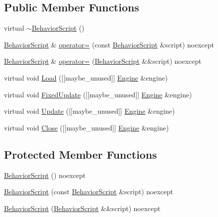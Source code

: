 \subsection*{Public Member Functions}
\begin{DoxyCompactItemize}
\item 
virtual \hyperlink{classmage_1_1_behavior_script_a61e4825ba0fc7746d49faa44ed7bc481}{$\sim$\+Behavior\+Script} ()
\item 
\hyperlink{classmage_1_1_behavior_script}{Behavior\+Script} \& \hyperlink{classmage_1_1_behavior_script_adb153676123adadacf023e4f3804abf5}{operator=} (const \hyperlink{classmage_1_1_behavior_script}{Behavior\+Script} \&script) noexcept
\item 
\hyperlink{classmage_1_1_behavior_script}{Behavior\+Script} \& \hyperlink{classmage_1_1_behavior_script_aefeae227ee8d2452bf05782604f5011e}{operator=} (\hyperlink{classmage_1_1_behavior_script}{Behavior\+Script} \&\&script) noexcept
\item 
virtual void \hyperlink{classmage_1_1_behavior_script_ae7864876b2ffb1d1d8d8a56e3099f1f2}{Load} (\mbox{[}\mbox{[}maybe\+\_\+unused\mbox{]}\mbox{]} \hyperlink{classmage_1_1_engine}{Engine} \&engine)
\item 
virtual void \hyperlink{classmage_1_1_behavior_script_ae4b9cb7f3ee9f96d69682aef42f8bb12}{Fixed\+Update} (\mbox{[}\mbox{[}maybe\+\_\+unused\mbox{]}\mbox{]} \hyperlink{classmage_1_1_engine}{Engine} \&engine)
\item 
virtual void \hyperlink{classmage_1_1_behavior_script_a085634661326b59850c1111e537baa4e}{Update} (\mbox{[}\mbox{[}maybe\+\_\+unused\mbox{]}\mbox{]} \hyperlink{classmage_1_1_engine}{Engine} \&engine)
\item 
virtual void \hyperlink{classmage_1_1_behavior_script_a5a8d2d38b369e193bf8cc20a74708397}{Close} (\mbox{[}\mbox{[}maybe\+\_\+unused\mbox{]}\mbox{]} \hyperlink{classmage_1_1_engine}{Engine} \&engine)
\end{DoxyCompactItemize}
\subsection*{Protected Member Functions}
\begin{DoxyCompactItemize}
\item 
\hyperlink{classmage_1_1_behavior_script_adbe64d10ebd511f05af9e0930e245913}{Behavior\+Script} () noexcept
\item 
\hyperlink{classmage_1_1_behavior_script_a0f3baaa9549ab272f0711c06d33ad223}{Behavior\+Script} (const \hyperlink{classmage_1_1_behavior_script}{Behavior\+Script} \&script) noexcept
\item 
\hyperlink{classmage_1_1_behavior_script_abae69e797a05fa2cd1c3b7704f1c6767}{Behavior\+Script} (\hyperlink{classmage_1_1_behavior_script}{Behavior\+Script} \&\&script) noexcept
\end{DoxyCompactItemize}


